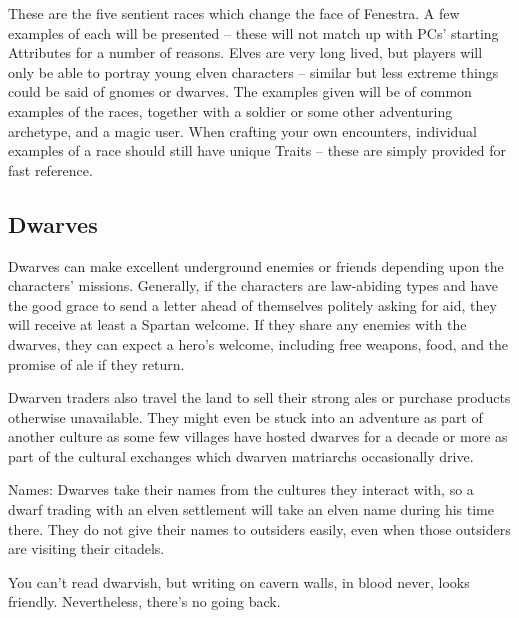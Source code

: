 \begin{multicols}{2}

\noindent
These are the five sentient races which change the face of Fenestra.
A few examples of each will be presented -- these will not match up with PCs' starting Attributes for a number of reasons.
Elves are very long lived, but players will only be able to portray young elven characters -- similar but less extreme things could be said of gnomes or dwarves.
The examples given will be of common examples of the races, together with a soldier or some other adventuring archetype, and a magic user.
When crafting your own encounters, individual examples of a race should still have unique Traits -- these are simply provided for fast reference.

\subsection{Dwarves}

Dwarves can make excellent underground enemies or friends depending upon the characters' missions.
Generally, if the characters are law-abiding types and have the good grace to send a letter ahead of themselves politely asking for aid, they will receive at least a Spartan welcome.
If they share any enemies with the dwarves, they can expect a hero's welcome, including free weapons, food, and the promise of ale if they return.

Dwarven traders also travel the land to sell their strong ales or purchase products otherwise unavailable.
They might even be stuck into an adventure as part of another culture as some few villages have hosted dwarves for a decade or more as part of the cultural exchanges which dwarven matriarchs occasionally drive.

Names: Dwarves take their names from the cultures they interact with, so a dwarf trading with an elven settlement will take an elven name during his time there.
They do not give their names to outsiders easily, even when those outsiders are visiting their citadels.

\begin{boxtext}

	You can't read dwarvish, but writing on cavern walls, in blood never, looks friendly.
	Nevertheless, there's no going back.

\end{boxtext}

\begin{boxtext}


\end{boxtext}
\end{multicols}
